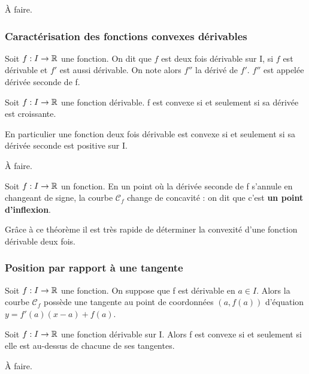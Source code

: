 \documentclass[a4paper, 12pt]{article}
\begin{document}
\begin{demonstration}
    À faire.
\end{demonstration}


\subsubsection{Caractérisation des fonctions convexes dérivables}

\begin{definition}
    Soit $f: I \rightarrow \mathbb{R}$ une fonction. On dit que $f$ est deux fois dérivable sur I, si $f$ est dérivable et $f'$ est aussi dérivable.
    On note alors $f''$ la dérivé de $f'$. $f''$ est appelée dérivée seconde de f.
\end{definition}

\begin{theorem}
    Soit $f: I \rightarrow \mathbb{R}$ une fonction dérivable. f est convexe si et seulement si sa dérivée est croissante.

    En particulier une fonction deux fois dérivable est convexe si et seulement si sa dérivée seconde est positive sur I.
\end{theorem}

\begin{demonstration}
    À faire.
\end{demonstration}

\begin{definition}
    Soit $f: I \rightarrow \mathbb{R}$ un fonction. En un point où la dérivée seconde de f s'annule en changeant de signe, la courbe $\mathscr{C}_f$ change de concavité : on dit que c'est \textbf{un point d'inflexion}.
\end{definition}

\begin{remark}
    Grâce à ce théorème il est très rapide de déterminer la convexité d'une fonction dérivable deux fois.
\end{remark}

\subsubsection{Position par rapport à une tangente}

Soit $f: I \rightarrow \mathbb{R}$ une fonction. On suppose que f est dérivable en $a \in I$. Alors la courbe $\mathscr{C}_f$ possède une tangente au point de coordonnées $(a, f(a))$ d'équation $y = f'(a)(x - a) + f(a)$.

\begin{proposition}
    Soit $f: I \rightarrow \mathbb{R}$ une fonction dérivable sur I. Alors f est convexe si et seulement si elle est au-dessus de chacune de ses tangentes.
\end{proposition}

\begin{demonstration}
    À faire.
\end{demonstration}
\end{document}
